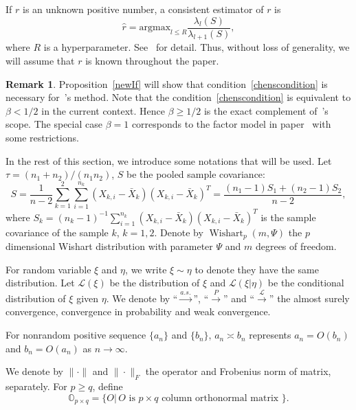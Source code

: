 \documentclass[review]{elsarticle}
\theoremstyle{plain}
\theoremstyle{definition}
\newtheorem{remark}{\quad\quad Remark}
\theoremstyle{remark}
\begin{document}
If $r$ is an unknown positive number, a consistent estimator of $r$ is
\begin{equation}\label{estimateR}
    \hat{r}=\textrm{argmax}_{l\leq R}\frac{\lambda_l(S)}{\lambda_{l+1}(S)},
\end{equation}
where $R$ is a hyperparameter.
    See~\cite{Ahn2009Eigenvalue} for detail.
    Thus, without loss of generality, we will assume that $r$ is known throughout the paper.


\begin{remark}
Proposition~\ref{newIf} will show that condition~\eqref{chenscondition} is necessary for~\cite{Chen2010A}'s  method.
Note that the condition~\eqref{chenscondition} is equivalent to $\beta< 1/2$ in the current context.
Hence $\beta\geq 1/2$ is the exact complement of~\cite{Chen2010A}'s scope.
The special case $\beta=1$ corresponds to the factor model in paper~\cite{Ma2015A} with some restrictions.
\end{remark}

In the rest of this section, we introduce some  notations that will be used. Let $\tau={(n_1+n_2)}/{(n_1n_2)}$, $S$ be the pooled sample covariance:
\begin{equation*}
S=\frac{1}{n-2}\sum_{k=1}^2\sum_{i=1}^{n_k} (X_{k,i}-\bar{X}_k) {(X_{k,i}-\bar{X}_k)}^T
    =\frac{(n_1-1)S_1+(n_2-1)S_2}{n-2},
\end{equation*}
where
$S_k={(n_k -1)}^{-1}\sum_{i=1}^{n_k} (X_{k,i}-\bar{X}_k) {(X_{k,i}-\bar{X}_k)}^T
$
is the sample covariance  of the sample $k$, $k=1,2$.
Denote by $\operatorname{Wishart}_p(m,\Psi)$ the $p$ dimensional Wishart distribution with parameter $\Psi$ and $m$ degrees of freedom.

For random variable $\xi$ and $\eta$,
  we write $\xi\sim \eta$ to denote they have the same distribution.
  Let $\mathcal{L}(\xi)$ be the distribution of $\xi$ and $\mathcal{L}(\xi|\eta)$ be the conditional distribution of $\xi$ given $\eta$.
  We denote by ``$\xrightarrow{a.s.}$'', ``$\xrightarrow{P}$'' and ``$\xrightarrow{\mathcal{L}}$'' the almost surely convergence, convergence in probability and weak convergence.

For nonrandom positive sequence $\{a_n\}$ and $\{b_n\}$, $a_n\asymp b_n$ represents $a_n=O(b_n)$ and $b_n=O(a_n)$ as $n\to \infty$.

We denote by $\|\cdot \|$ and $\|\cdot\|_F$ the operator and Frobenius  norm of matrix, separately.
For $p\geq q$, define
\begin{equation*}
\mathbb{O}_{p\times q}=\{O|\, \textrm{$O$ is $p\times q$ column orthonormal matrix }\}.
\end{equation*}
\end{document}

